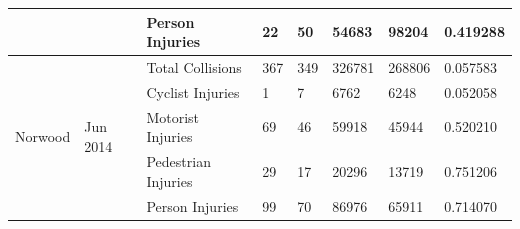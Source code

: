 \documentclass[10pt,journal,compsoc]{IEEEtran}
\begin{document}
\begin{table}[]
\begin{tabular}{|l|l|l|l|l|l|l|l|}
                                               &                             & Person Injuries     & 22        & 50       & 54683      & 98204     & 0.419288 \\ \hline
\multirow{5}{*}{Norwood}                       & \multirow{5}{*}{Jun 2014} & Total Collisions    & 367       & 349      & 326781     & 268806    & 0.057583 \\ \cline{3-8} 
                                               &                             & Cyclist Injuries    & 1         & 7        & 6762       & 6248      & 0.052058 \\ \cline{3-8} 
                                               &                             & Motorist Injuries   & 69        & 46       & 59918      & 45944     & 0.520210 \\ \cline{3-8} 
                                               &                             & Pedestrian Injuries & 29        & 17       & 20296      & 13719     & 0.751206 \\ \cline{3-8} 
                                               &                             & Person Injuries     & 99        & 70       & 86976      & 65911     & 0.714070 \\ \hline
\end{tabular}
\end{table}
\end{document}
